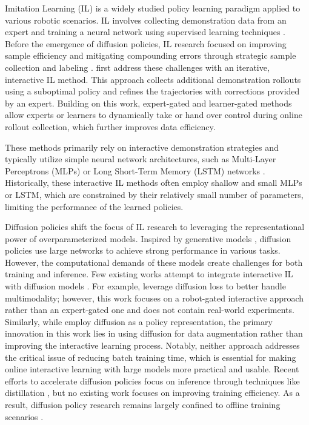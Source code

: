 Imitation Learning (IL) is a widely studied policy learning paradigm applied to various robotic scenarios. IL involves collecting demonstration data from an expert and training a neural network using supervised learning techniques \cite{zare2024survey}. Before the emergence of diffusion policies, IL research focused on improving sample efficiency and mitigating compounding errors through strategic sample collection and labeling \cite{spencer2021feedback}. \citet{ross2011reduction} first address these challenges with an iterative, interactive IL method. This approach collects additional demonstration rollouts using a suboptimal policy and refines the trajectories with corrections provided by an expert. Building on this work, expert-gated \cite{kelly2019hg, sun_mega_dagger} and learner-gated \cite{hoque2021thriftydagger, hoque2021lazydagger} methods allow experts or learners to dynamically take or hand over control during online rollout collection, which further improves data efficiency.

These methods primarily rely on interactive demonstration strategies and typically utilize simple neural network architectures, such as Multi-Layer Perceptrons (MLPs) \cite{jin2020geometric, loquercio2021learning, zhou2024developing} or Long Short-Term Memory (LSTM) networks \cite{cai2019vision, huang2020real, wu2024deep}. Historically, these interactive IL methods often employ shallow and small MLPs or LSTM, which are constrained by their relatively small number of parameters, limiting the performance of the learned policies.

Diffusion policies \cite{chi_dp} shift the focus of IL research to leveraging the representational power of overparameterized models. Inspired by generative models \cite{ho2020denoising, song2020denoising}, diffusion policies use large networks to achieve strong performance in various tasks. However, the computational demands of these models create challenges for both training and inference. Few existing works attempt to integrate interactive IL with diffusion models \cite{lee2024diff, zhang2024diffusion}. For example, \citet{lee2024diff} leverage diffusion loss to better handle multimodality; however, this work focuses on a robot-gated interactive approach rather than an expert-gated one and does not contain real-world experiments. Similarly, while \citet{zhang2024diffusion} employ diffusion as a policy representation, the primary innovation in this work lies in using diffusion for data augmentation rather than improving the interactive learning process. Notably, neither approach addresses the critical issue of reducing batch training time, which is essential for making online interactive learning with large models more practical and usable. Recent efforts to accelerate diffusion policies focus on inference through techniques like distillation \cite{prasad2024consistency, wang2024one}, but no existing work focuses on improving training efficiency. As a result, diffusion policy research remains largely confined to offline training scenarios \cite{sridhar2024nomad, sun2024comparative, ze20243d}.